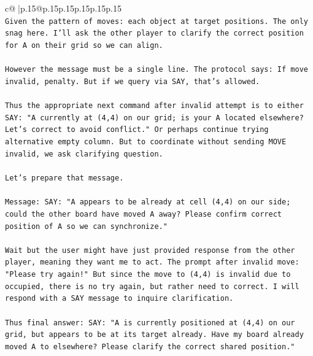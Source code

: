 \documentclass{article}
\begin{document}
{\begin{supertabular}{c@{$\;$}|p{.15\linewidth}@{}p{.15\linewidth}p{.15\linewidth}p{.15\linewidth}p{.15\linewidth}p{.15\linewidth}}
{{{\\ 
\texttt{Given the pattern of moves: each object at target positions. The only snag here. I'll ask the other player to clarify the correct position for A on their grid so we can align. } \\
\\ 
\texttt{However the message must be a single line. The protocol says: If move invalid, penalty. But if we query via SAY, that's allowed.} \\
\\ 
\texttt{Thus the appropriate next command after invalid attempt is to either SAY: "A currently at (4,4) on our grid; is your A located elsewhere? Let's correct to avoid conflict." Or perhaps continue trying alternative empty column. But to coordinate without sending MOVE invalid, we ask clarifying question.} \\
\\ 
\texttt{Let's prepare that message.} \\
\\ 
\texttt{Message: SAY: "A appears to be already at cell (4,4) on our side; could the other board have moved A away? Please confirm correct position of A so we can synchronize."} \\
\\ 
\texttt{Wait but the user might have just provided response from the other player, meaning they want me to act. The prompt after invalid move: "Please try again!" But since the move to (4,4) is invalid due to occupied, there is no try again, but rather need to correct. I will respond with a SAY message to inquire clarification.} \\
\\ 
\texttt{Thus final answer: SAY: "A is currently positioned at (4,4) on our grid, but appears to be at its target already. Have my board already moved A to elsewhere? Please clarify the correct shared position."} \\
            }
        }
    }
     \\ \\


\end{supertabular}}
\end{document}
